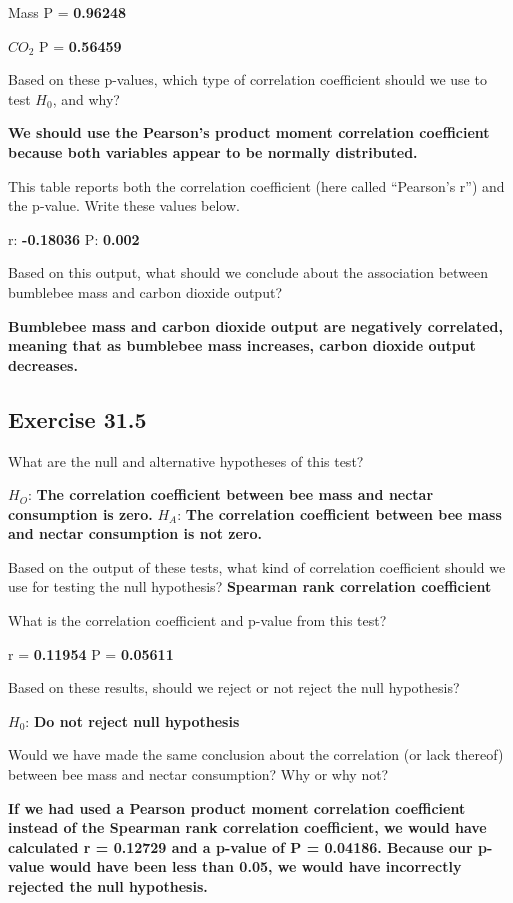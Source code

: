 \documentclass[
]{scrbook}
\begin{document}
Mass P = \textbf{0.96248}

\(CO_2\) P = \textbf{0.56459}

Based on these p-values, which type of correlation coefficient should we use to test \(H_{0}\), and why?

\textbf{We should use the Pearson's product moment correlation coefficient because both variables appear to be normally distributed.}

This table reports both the correlation coefficient (here called ``Pearson's r'') and the p-value. Write these values below.

r: \textbf{-0.18036}
P: \textbf{0.002}

Based on this output, what should we conclude about the association between bumblebee mass and carbon dioxide output?

\textbf{Bumblebee mass and carbon dioxide output are negatively correlated, meaning that as bumblebee mass increases, carbon dioxide output decreases.}

\hypertarget{exercise-31.5}{%
\subsection{Exercise 31.5}\label{exercise-31.5}}

What are the null and alternative hypotheses of this test?

\(H_{O}\): \textbf{The correlation coefficient between bee mass and nectar consumption is zero.}
\(H_{A}\): \textbf{The correlation coefficient between bee mass and nectar consumption is not zero.}

Based on the output of these tests, what kind of correlation coefficient should we use for testing the null hypothesis? \textbf{Spearman rank correlation coefficient}

What is the correlation coefficient and p-value from this test?

r = \textbf{0.11954}
P = \textbf{0.05611}

Based on these results, should we reject or not reject the null hypothesis?

\(H_{0}\): \textbf{Do not reject null hypothesis}

Would we have made the same conclusion about the correlation (or lack thereof) between bee mass and nectar consumption? Why or why not?

\textbf{If we had used a Pearson product moment correlation coefficient instead of the Spearman rank correlation coefficient, we would have calculated r = 0.12729 and a p-value of P = 0.04186. Because our p-value would have been less than 0.05, we would have incorrectly rejected the null hypothesis.}
\end{document}

